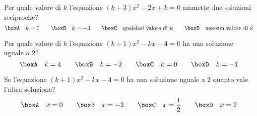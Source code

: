 \begin{esercizio}
 \label{ese:3.120}
Per quale valore di $k$ l'equazione $(k + 3) x^{2}-2x + k = 0$ ammette due soluzioni reciproche?
\[\boxA\quad k = 0\qquad\boxB\quad k = -3\qquad\boxC\quad \text{qualsiasi valore di }k\qquad\boxD\quad \text{nesssun valore di }k\]
\end{esercizio}

\begin{esercizio}
 \label{ese:3.121}
Per quale valore di $k$ l'equazione $(k + 1) x^{2}-kx-4 = 0$ ha una soluzione uguale a $2$?
\[\boxA\quad k = 4\qquad\boxB\quad k =-2\qquad\boxC\quad k = 0\qquad\boxD\quad k =-1\]
\end{esercizio}

\begin{esercizio}
 \label{ese:3.122}
Se l'equazione $(k + 1) x^{2}-kx-4 = 0$ ha una soluzione uguale a $2$ quanto vale l'altra soluzione?
\[\boxA\quad x = 0\qquad\boxB\quad x =-2\qquad\boxC\quad x = \frac{1}{2}\qquad\boxD\quad x = 2\]
\end{esercizio}

